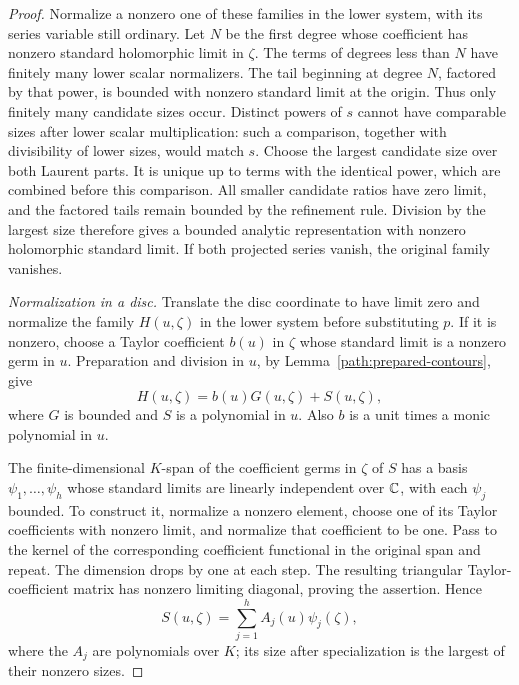 \begin{proof}
Normalize a nonzero one of these families in the lower system, with
its series variable still ordinary.  Let \(N\) be the first degree
whose coefficient has nonzero standard holomorphic limit in
\(\zeta\).  The terms of degrees less than \(N\) have finitely many
lower scalar normalizers.  The tail beginning at degree \(N\),
factored by that power, is bounded with nonzero standard limit at the
origin.  Thus only finitely many candidate sizes occur.  Distinct
powers of \(s\) cannot have comparable sizes after lower scalar
multiplication: such a comparison, together with divisibility of lower
sizes, would match \(s\).  Choose the largest candidate size over
both Laurent parts.  It is unique up to terms with the identical
power, which are combined before this comparison.  All smaller
candidate ratios have zero limit, and the factored tails remain
bounded by the refinement rule.  Division by the largest size
therefore gives a bounded analytic representation with nonzero
holomorphic standard limit.  If both projected series vanish, the
original family vanishes.

\emph{Normalization in a disc.}
Translate the disc coordinate to have limit zero and normalize the
family \(H(u,\zeta)\) in the lower system before substituting \(p\).
If it is nonzero, choose a Taylor coefficient \(b(u)\) in \(\zeta\)
whose standard limit is a nonzero germ in \(u\).  Preparation and
division in \(u\), by Lemma~\ref{path:prepared-contours}, give
\begin{equation}\label{path:eq-disc-division}
 H(u,\zeta)=b(u)G(u,\zeta)+S(u,\zeta),
\end{equation}
where \(G\) is bounded and \(S\) is a polynomial in \(u\).  Also
\(b\) is a unit times a monic polynomial in \(u\).

The finite-dimensional \(K\)-span of the coefficient germs in
\(\zeta\) of \(S\) has a basis \(\psi_1,\ldots,\psi_h\) whose
standard limits are linearly independent over \(\mathbb{C}\), with each
\(\psi_j\) bounded.  To construct it, normalize a nonzero element,
choose one of its Taylor coefficients with nonzero limit, and normalize
that coefficient to be one.  Pass to the kernel of the corresponding
coefficient functional in the original span and repeat.  The dimension
drops by one at each step.  The resulting triangular Taylor-coefficient
matrix has nonzero limiting diagonal, proving the assertion.  Hence
\[
 S(u,\zeta)=\sum_{j=1}^h A_j(u)\psi_j(\zeta),
\]
where the \(A_j\) are polynomials over \(K\); its size after
specialization is the largest of their nonzero sizes.


\end{proof}
